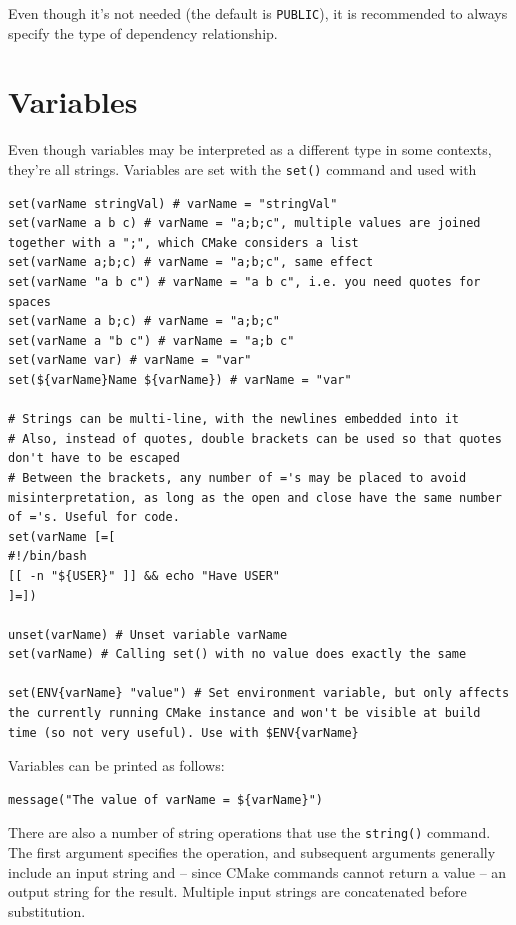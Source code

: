 \documentclass[table, xcdraw]{article}%
\begin{document}
Even though it's not needed (the default is \texttt{PUBLIC}), it is recommended to always specify the type of dependency relationship.

\section{Variables}

Even though variables may be interpreted as a different type in some contexts, they're all strings. Variables are set with the \texttt{set()} command and used with %

\begin{verbatim}
set(varName stringVal) # varName = "stringVal"
set(varName a b c) # varName = "a;b;c", multiple values are joined together with a ";", which CMake considers a list
set(varName a;b;c) # varName = "a;b;c", same effect
set(varName "a b c") # varName = "a b c", i.e. you need quotes for spaces
set(varName a b;c) # varName = "a;b;c"
set(varName a "b c") # varName = "a;b c"
set(varName var) # varName = "var"
set(${varName}Name ${varName}) # varName = "var"

# Strings can be multi-line, with the newlines embedded into it
# Also, instead of quotes, double brackets can be used so that quotes don't have to be escaped
# Between the brackets, any number of ='s may be placed to avoid misinterpretation, as long as the open and close have the same number of ='s. Useful for code.
set(varName [=[
#!/bin/bash
[[ -n "${USER}" ]] && echo "Have USER"
]=])

unset(varName) # Unset variable varName
set(varName) # Calling set() with no value does exactly the same

set(ENV{varName} "value") # Set environment variable, but only affects the currently running CMake instance and won't be visible at build time (so not very useful). Use with $ENV{varName}
\end{verbatim}

Variables can be printed as follows:

\begin{verbatim}
message("The value of varName = ${varName}")
\end{verbatim}

There are also a number of string operations that use the \texttt{string()} command. The first argument specifies the operation, and subsequent arguments generally include an input string and -- since CMake commands cannot return a value -- an output string for the result. Multiple input strings are concatenated before substitution.
\end{document}
